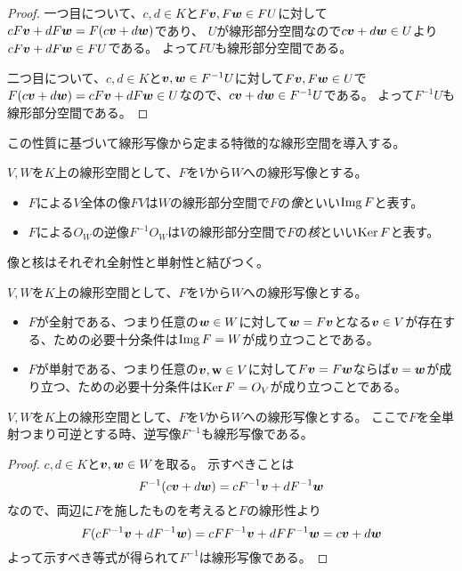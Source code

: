 \begin{proof}
一つ目について、$c, d \in K$と$F\vb*{v}, F\vb*{w} \in F U$に対して$c F\vb*{v}+d F\vb*{w} = F(c \vb*{v}+d \vb*{w})$であり、
$U$が線形部分空間なので$c \vb*{v}+d \vb*{w} \in U$より$c F\vb*{v}+d F\vb*{w} \in F U$である。
よって$F U$も線形部分空間である。

二つ目について、$c, d \in K$と$\vb*{v}, \vb*{w} \in F^{-1} U$に対して$F\vb*{v}, F\vb*{w} \in U$で$F(c\vb*{v}+d\vb*{w}) = c F\vb*{v}+d F\vb*{w} \in U$なので、$c\vb*{v}+d\vb*{w} \in F^{-1} U$である。
よって$F^{-1} U$も線形部分空間である。
\end{proof}

この性質に基づいて線形写像から定まる特徴的な線形空間を導入する。

\begin{definition}[像と核]
$V, W$を$K$上の線形空間として、$F$を$V$から$W$への線形写像とする。
\begin{itemize}
\item
$F$による$V$全体の像$F V$は$W$の線形部分空間で$F$の\emph{像}といい$\operatorname{Img} F$と表す。
\item
$F$による$O_W$の逆像$F^{-1} O_W$は$V$の線形部分空間で$F$の\emph{核}といい$\operatorname{Ker} F$と表す。
\end{itemize}
\end{definition}

像と核はそれぞれ全射性と単射性と結びつく。

\begin{proposition}
$V, W$を$K$上の線形空間として、$F$を$V$から$W$への線形写像とする。
\begin{itemize}
\item
$F$が全射である、つまり任意の$\vb*{w} \in W$に対して$\vb*{w} = F\vb*{v}$となる$\vb*{v} \in V$が存在する、ための必要十分条件は$\operatorname{Img} F = W$が成り立つことである。
\item
$F$が単射である、つまり任意の$\vb*{v}, \vb{w} \in V$に対して$F\vb*{v} = F\vb*{w}$ならば$\vb*{v} = \vb*{w}$が成り立つ、ための必要十分条件は$\operatorname{Ker} F = O_V$が成り立つことである。
\end{itemize}
\end{proposition}

\begin{proposition}
$V, W$を$K$上の線形空間として、$F$を$V$から$W$への線形写像とする。
ここで$F$を全単射つまり可逆とする時、逆写像$F^{-1}$も線形写像である。
\end{proposition}

\begin{proof}
$c, d \in K$と$\vb*{v}, \vb*{w} \in W$を取る。
示すべきことは
$$
F^{-1}(c\vb*{v}+d\vb*{w}) = c F^{-1}\vb*{v}+d F^{-1}\vb*{w}
$$
なので、両辺に$F$を施したものを考えると$F$の線形性より
$$
F(c F^{-1}\vb*{v}+d F^{-1}\vb*{w}) = c F F^{-1}\vb*{v}+d F F^{-1}\vb*{w} = c\vb*{v}+d\vb*{w}
$$
よって示すべき等式が得られて$F^{-1}$は線形写像である。
\end{proof}

